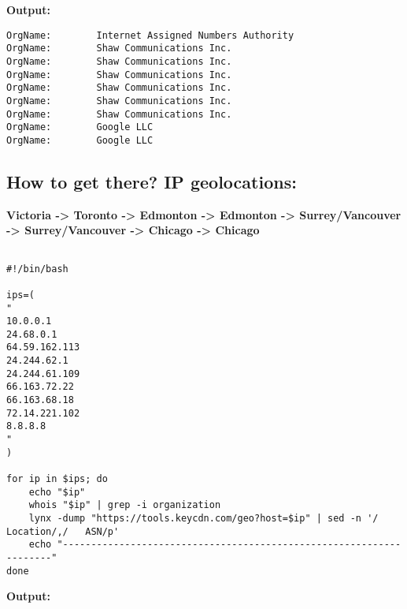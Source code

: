 \documentclass[
	letterpaper, %
	10pt, %
]{CSUniSchoolLabReport}
\begin{document}
\textbf{Output: }
\begin{verbatim}
OrgName:        Internet Assigned Numbers Authority
OrgName:        Shaw Communications Inc.
OrgName:        Shaw Communications Inc.
OrgName:        Shaw Communications Inc.
OrgName:        Shaw Communications Inc.
OrgName:        Shaw Communications Inc.
OrgName:        Shaw Communications Inc.
OrgName:        Google LLC
OrgName:        Google LLC

\end{verbatim}
\newpage

\subsection{How to get there? IP geolocations: }

\textbf{Victoria -> Toronto -> Edmonton -> Edmonton -> Surrey/Vancouver -> 
Surrey/Vancouver -> Chicago -> Chicago}
\begin{center}
\begin{verbatim}

#!/bin/bash

ips=(
"
10.0.0.1
24.68.0.1
64.59.162.113
24.244.62.1
24.244.61.109
66.163.72.22
66.163.68.18
72.14.221.102
8.8.8.8
"
)

for ip in $ips; do
    echo "$ip"
    whois "$ip" | grep -i organization 
    lynx -dump "https://tools.keycdn.com/geo?host=$ip" | sed -n '/   Location/,/   ASN/p'
    echo "--------------------------------------------------------------------"
done

\end{verbatim}
\end{center}

\textbf{Output: }
\end{document}
